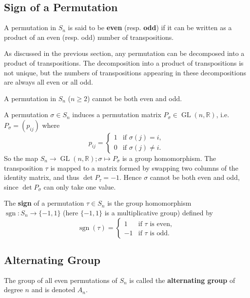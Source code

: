 \subsection{Sign of a Permutation}
\begin{definition}
	A permutation in $S_n$ is said to be \textbf{even} (resp. \textbf{odd}) if it can be written as a product of an even (resp. odd) number of transpositions.
\end{definition}
As discussed in the previous section, any permutation can
be decomposed into a product of transpositions. The decomposition into a
product of transpositions is not unique, but the numbers of transpositions 
appearing in these decompositions are always all even or all odd.
\begin{theorem}
	A permutation in $S_n$ ($n\geq 2$) cannot be both even and odd.
\end{theorem}
\begin{sketch}
	A permutation $\sigma\in S_n$ induces a permutation matrix $P_{\sigma}\in \operatorname{GL}(n,\mathbb{R})$, i.e. $P_{\sigma} = (p_{ij})$ where 
	\begin{equation*}
		p_{ij} = \begin{cases}
			1 & \text{if } \sigma(j) = i,
			\\
			0 & \text{if } \sigma(j) \neq  i.
		\end{cases}
	\end{equation*} So the map $S_n\rightarrow \operatorname{GL}(n,\mathbb{R}); \sigma\mapsto P_{\sigma}$ is a group homomorphism. The
	transposition $\tau$ is mapped to a matrix formed by swapping two columns of the identity matrix, and thus $\det P_\tau = -1$. Hence $\sigma$ cannot be both even and odd, since $\det P_\sigma$ can only take one value.
\end{sketch}
\begin{definition}
	The \textbf{sign} of a permutation $\tau\in S_n$ is the group homomorphism  $\operatorname{sgn}:S_n\rightarrow \{-1,1\}$ (here $\{-1,1\}$ is a multiplicative group) defined by 
	\begin{equation*}
		\operatorname{sgn}(\tau) = \begin{cases}
			1 &\text{if }\tau\text{ is even},
			\\
			-1 &\text{if }\tau\text{ is odd}.
		\end{cases}
	\end{equation*}
\end{definition}

\subsection{Alternating Group}
\begin{definition}
	The group of all even permutations of $S_n$ is called the \textbf{alternating group} of degree $n$ and is denoted $A_n$.
\end{definition}

